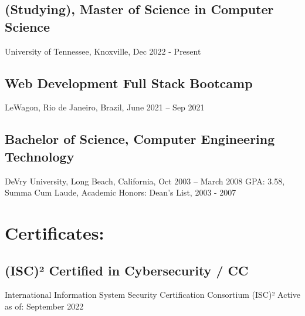 \documentclass[letter,10pt]{article}
\begin{document}
\subsection*{(Studying), Master of Science in Computer Science}
\label{sec:org414afc9}
University of Tennessee, Knoxville, Dec 2022 - Present
\subsection*{Web Development Full Stack Bootcamp}
\label{sec:org26ed2da}
LeWagon, Rio de Janeiro, Brazil, June 2021 – Sep 2021
\subsection*{Bachelor of Science, Computer Engineering Technology}
\label{sec:orgebefd9a}
DeVry University, Long Beach, California, Oct 2003 – March 2008
GPA: 3.58, Summa Cum Laude, Academic Honors: Dean’s List, 2003 - 2007

\section*{Certificates:}
\label{sec:orgc186218}
\subsection*{(ISC)² Certified in Cybersecurity / CC}
\label{sec:org76b4b1b}
International Information System Security Certification Consortium (ISC)²
Active as of: September 2022
\end{document}
